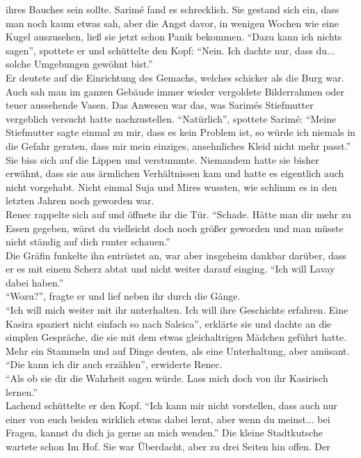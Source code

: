 ihres Bauches sein sollte. Sarimé fand es schrecklich. Sie gestand sich ein, dass man noch kaum 
etwas sah, aber die Angst davor, in wenigen Wochen wie eine Kugel auszusehen, ließ sie jetzt schon 
Panik bekommen. 
``Dazu kann ich nichts sagen'', spottete er und schüttelte den Kopf: ``Nein. Ich dachte nur, dass 
du... solche Umgebungen gewöhnt bist.''\\
Er deutete auf die Einrichtung des Gemachs, welches schicker als die Burg war. Auch sah man im 
ganzen Gebäude immer wieder vergoldete Bilderrahmen oder teuer aussehende Vasen. Das Anwesen war 
das, was Sarimés Stiefmutter vergeblich versucht hatte nachzustellen. ``Natürlich'', spottete 
Sarimé: ``Meine Stiefmutter sagte einmal zu mir, dass es kein Problem ist, so würde ich niemals in 
die Gefahr geraten, dass mir mein einziges, ansehnliches Kleid nicht mehr passt.''\\
Sie biss sich auf die Lippen und verstummte. Niemandem hatte sie bisher erwähnt, dass sie aus 
ärmlichen Verhältnissen kam und hatte es eigentlich auch nicht vorgehabt. Nicht einmal Suja und 
Mires wussten, wie schlimm es in den letzten Jahren noch geworden war.\\
Renec rappelte sich auf und öffnete ihr die Tür. ``Schade. Hätte man dir mehr zu Essen gegeben, 
wärst du vielleicht doch noch größer geworden und man müsste nicht ständig auf dich runter 
schauen.''\\
Die Gräfin funkelte ihn entrüstet an, war aber insgeheim dankbar darüber, dass er es mit einem 
Scherz abtat und nicht weiter darauf einging. ``Ich will Lavay dabei haben.''\\
``Wozu?'', fragte er und lief neben ihr durch die Gänge.\\
``Ich will mich weiter mit ihr unterhalten. Ich will ihre Geschichte erfahren. Eine Kasira spaziert 
nicht einfach so nach Saleica'', erklärte sie und dachte an die simplen Gespräche, die sie mit dem 
etwas gleichaltrigen Mädchen geführt hatte. Mehr ein Stammeln und auf Dinge deuten, als eine 
Unterhaltung, aber amüsant.\\
``Die kann ich dir auch erzählen'', erwiderte Renec.\\
``Als ob sie dir die Wahrheit sagen würde. Lass mich doch von ihr Kasirisch lernen.''\\
Lachend schüttelte er den Kopf. ``Ich kann mir nicht vorstellen, dass auch nur einer von euch 
beiden wirklich etwas dabei lernt, aber wenn du meinst... bei Fragen, kannst du dich ja gerne an 
mich wenden.''
Die kleine Stadtkutsche wartete schon Im Hof. Sie war Überdacht, aber zu drei Seiten hin offen. Der 
